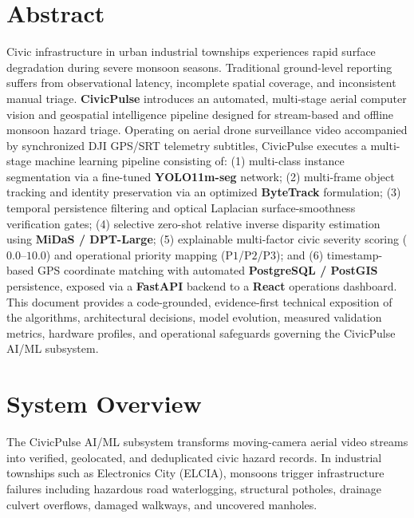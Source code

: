 \documentclass[11pt,a4paper]{article}
\begin{document}
\tableofcontents
\newpage
{}
\setcounter{page}{1}

\section{Abstract}
Civic infrastructure in urban industrial townships experiences rapid surface degradation during severe monsoon seasons. Traditional ground-level reporting suffers from observational latency, incomplete spatial coverage, and inconsistent manual triage. \textbf{CivicPulse} introduces an automated, multi-stage aerial computer vision and geospatial intelligence pipeline designed for stream-based and offline monsoon hazard triage. Operating on aerial drone surveillance video accompanied by synchronized DJI GPS/SRT telemetry subtitles, CivicPulse executes a multi-stage machine learning pipeline consisting of: (1) multi-class instance segmentation via a fine-tuned \textbf{YOLO11m-seg} network; (2) multi-frame object tracking and identity preservation via an optimized \textbf{ByteTrack} formulation; (3) temporal persistence filtering and optical Laplacian surface-smoothness verification gates; (4) selective zero-shot relative inverse disparity estimation using \textbf{MiDaS / DPT-Large}; (5) explainable multi-factor civic severity scoring ($0.0$--$10.0$) and operational priority mapping ($\text{P1}$/$\text{P2}$/$\text{P3}$); and (6) timestamp-based GPS coordinate matching with automated \textbf{PostgreSQL / PostGIS} persistence, exposed via a \textbf{FastAPI} backend to a \textbf{React} operations dashboard. This document provides a code-grounded, evidence-first technical exposition of the algorithms, architectural decisions, model evolution, measured validation metrics, hardware profiles, and operational safeguards governing the CivicPulse AI/ML subsystem.

\section{System Overview}
The CivicPulse AI/ML subsystem transforms moving-camera aerial video streams into verified, geolocated, and deduplicated civic hazard records. In industrial townships such as Electronics City (ELCIA), monsoons trigger infrastructure failures including hazardous road waterlogging, structural potholes, drainage culvert overflows, damaged walkways, and uncovered manholes. 
\end{document}
